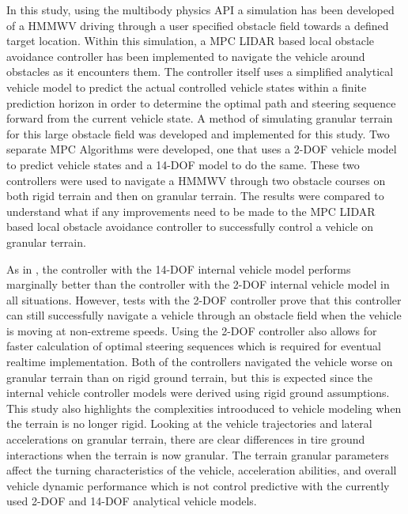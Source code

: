 \documentclass[12pt,onecolumn]{article}
\newcommand{\CHRONO}{{\sffamily{{Chrono}}}}
\begin{document}
In this study, using the multibody physics API {\CHRONO} a simulation has been developed of a HMMWV driving through a user specified obstacle field towards a defined target location. Within this simulation, a MPC LIDAR based local obstacle avoidance controller has been implemented to navigate the vehicle around obstacles as it encounters them. The controller itself uses a simplified analytical vehicle model to predict the actual controlled {\CHRONO} vehicle states within a finite prediction horizon in order to determine the optimal path and steering sequence forward from the current vehicle state. A method of simulating granular terrain for this large obstacle field was developed and implemented for this study. Two separate MPC Algorithms were developed, one that uses a 2-DOF vehicle model to predict {\CHRONO} vehicle states and a 14-DOF model to do the same. These two controllers were used to navigate a {\CHRONO} HMMWV through two obstacle courses on both rigid terrain and then on granular terrain. The results were compared to understand what if any improvements need to be made to the MPC LIDAR based local obstacle avoidance controller to successfully control a vehicle on granular terrain. 

As in \cite{ModelFidelity2016}, the controller with the 14-DOF internal vehicle model performs marginally better than the controller with the 2-DOF internal vehicle model in all situations. However, tests with the 2-DOF controller prove that this controller can still successfully navigate a vehicle through an obstacle field when the vehicle is moving at non-extreme speeds. Using the 2-DOF controller also allows for faster calculation of optimal steering sequences which is required for eventual realtime implementation. Both of the controllers navigated the vehicle worse on granular terrain than on rigid ground terrain, but this is expected since the internal vehicle controller models were derived using rigid ground assumptions. This study also highlights the complexities introoduced to vehicle modeling when the terrain is no longer rigid. Looking at the vehicle trajectories and lateral accelerations on granular terrain, there are clear differences in tire ground interactions when the terrain is now granular. The terrain granular parameters affect the turning characteristics of the vehicle, acceleration abilities, and overall vehicle dynamic performance which is not control predictive with the currently used 2-DOF and 14-DOF analytical vehicle models. 
\end{document}
